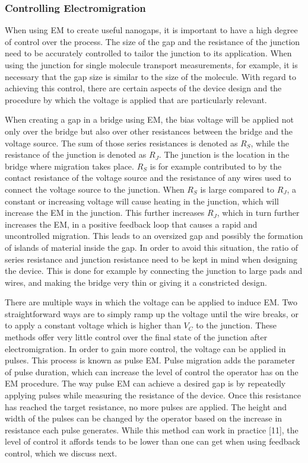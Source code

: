 \subsubsection{Controlling Electromigration}
When using EM to create useful nanogaps, it is important to have a high degree of control over the process. The size of the gap and the resistance of the junction need to be accurately controlled to tailor the junction to its application. When using the junction for single molecule transport measurements, for example, it is necessary that the gap size is similar to the size of the molecule. With regard to achieving this control, there are certain aspects of the device design and the procedure by which the voltage is applied that are particularly relevant. 

When creating a gap in a bridge using EM, the bias voltage will be applied not only over the bridge but also over other resistances between the bridge and the voltage source. The sum of those series resistances is denoted as $R_{S}$, while the resistance of the junction is denoted as $R_{J}$. The junction is the location in the bridge where migration takes place. $R_S$ is for example contributed to by the contact resistance of the voltage source and the resistance of any wires used to connect the voltage source to the junction. When $R_{S}$ is large compared to $R_{J}$, a constant or increasing voltage will cause heating in the junction, which will increase the EM in the junction. This further increases $R_J$, which in turn further increases the EM, in a positive feedback loop that causes a rapid and uncontrolled migration. This leads to an oversized gap and possibly the formation of islands of material inside the gap. In order to avoid this situation, the ratio of series resistance and junction resistance need to be kept in mind when designing the device. This is done for example by connecting the junction to large pads and wires, and making the bridge very thin or giving it a constricted design.

There are multiple ways in which the voltage can be applied to induce EM. Two straightforward ways are to simply ramp up the voltage until the wire breaks, or to apply a constant voltage which is higher than $V_C$ to the junction. These methods offer very little control over the final state of the junction after electromigration. In order to gain more control, the voltage can be applied in pulses. This process is known as pulse EM. Pulse migration adds the parameter of pulse duration, which can increase the level of control the operator has on the EM procedure. The way pulse EM can achieve a desired gap is by repeatedly applying pulses while measuring the resistance of the device. Once this resistance has reached the target resistance, no more pulses are applied. The height and width of the pulses can be changed by the operator based on the increase in resistance each pulse generates. While this method can work in practice [11], the level of control it affords tends to be lower than one can get when using feedback control, which we discuss next.


